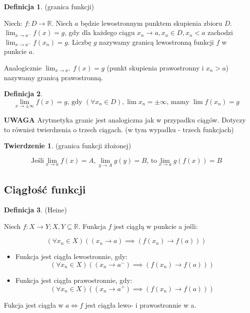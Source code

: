 \documentclass{article}
\theoremstyle{definition}
\newtheorem{de}{Definicja}[subsection]
\theoremstyle{definition}
\newtheorem{tw}{Twierdzenie}[subsection]
\theoremstyle{definition}
\begin{document}
\begin{de}
(granica funkcji)

Niech: $f: D \to \mathbb{R} $. Niech $a$ będzie lewostronnym punktem skupienia zbioru $D$.
$ \lim_{x \to a^-} f(x) = g $, gdy dla każdego ciągu $ x_n \to a, x_n \in D, x_n<a $
zachodzi $ \lim_{x \to a^-} f(x_n) = g $. Liczbę $g$ nazywamy granicą lewostronną funkcji $f$
w punkcie $a$.

Analogicznie $ \lim_{x \to a^+} f(x) = g $ (punkt skupienia prawostronny i $x_n>a$) nazywamy 
granicą prawostronną.
\end{de}

\begin{de}
$$
\lim_{x \to \pm \infty} f(x) = g \text{, gdy } (\forall x_n \in D), \lim x_n = \pm \infty
\text{, mamy } \lim f(x_n) = g
$$
\end{de}

\textbf{UWAGA}
Arytmetyka granic jest analogiczna jak w przypadku ciągów. Dotyczy to również twierdzenia 
o trzech ciągach. (w tym wypadku - trzech funkcjach)

\begin{tw}
(granica funkcji żłożonej)

$$
\text{Jeśli}
\lim_{x \to a} f(x) = A, 
\lim_{y \to A} g(y) = B\text{, to}
\lim_{x \to a} g(f(x)) = B
$$
\end{tw}

\subsection{Ciągłość funkcji}

\begin{de}
(Heine)

Niech $ f: X \to Y; X, Y \subseteq \mathbb{R} $. Funkcja $f$ jest ciągłą w punkcie a jeśli:

$$
(\forall x_n \in X)((x_n \to a) \implies (f(x_n) \to f(a)))
$$

\begin{itemize}
\item Funkcja jest ciągła lewostronnie, gdy:
$$
(\forall x_n \in X)((x_n \to a^-) \implies (f(x_n) \to f(a)))
$$
\item Funkcja jest ciągła prawostronnie, gdy:
$$
(\forall x_n \in X)((x_n \to a^+) \implies (f(x_n) \to f(a)))
$$
\end{itemize}

Fukcja jest ciągła w $a \iff f$ jest ciągła lewo- i prawostronnie w a.
\end{de}
\end{document}
